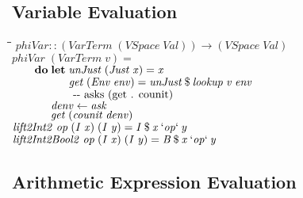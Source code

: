 \documentclass[10pt]{article}
\newlength{\lwidth}\setlength{\lwidth}{4.5cm}
\newlength{\cwidth}\setlength{\cwidth}{8mm} %
\newcommand{\Conid}[1]{\mathit{#1}}
\newcommand{\Varid}[1]{\mathit{#1}}
\begin{document}
\subsection{Variable Evaluation}

\begin{tabbing}
\qquad\=\hspace{\lwidth}\=\hspace{\cwidth}\=\+\kill
${\Varid{phiVar}\mathbin{::}(\Conid{VarTerm}\;(\Conid{VSpace}\;\Conid{Val}))\to (\Conid{VSpace}\;\Conid{Val})}$\\
${\Varid{phiVar}\;(\Conid{VarTerm}\;\Varid{v})\mathrel{=}}$\\
${\hskip2.00em\relax\mathbf{do}\;\mathbf{let}\;\Varid{unJust}\;(\Conid{Just}\;\Varid{x})\mathrel{=}\Varid{x}}$\\
${\hskip2.00em\relax\phantom{\mathbf{do}\;\mathbf{let}\;\mbox{}}\Varid{get}\;(\Conid{Env}\;\Varid{env})\mathrel{=}\Varid{unJust}\mathbin{\$}\Varid{lookup}\;\Varid{v}\;\Varid{env}}$\\
${\hskip2.00em\relax\phantom{\mathbf{do}\;\mbox{}}\mbox{\qquad-{}-  asks (get . counit)}}$\\
${\hskip2.00em\relax\phantom{\mathbf{do}\;\mbox{}}\Varid{denv}\leftarrow \Varid{ask}}$\\
${\hskip2.00em\relax\phantom{\mathbf{do}\;\mbox{}}\Varid{get}\;(\Varid{counit}\;\Varid{denv})}$\\
${}$\\
${}$\\
${\Varid{lift2Int2}\;\Varid{op}\;(\Conid{I}\;\Varid{x})\;(\Conid{I}\;\Varid{y})\mathrel{=}\Conid{I}\mathbin{\$}\Varid{x}\mathbin{`\Varid{op}`}\Varid{y}}$\\
${}$\\
${\Varid{lift2Int2Bool2}\;\Varid{op}\;(\Conid{I}\;\Varid{x})\;(\Conid{I}\;\Varid{y})\mathrel{=}\Conid{B}\mathbin{\$}\Varid{x}\mathbin{`\Varid{op}`}\Varid{y}}$
\end{tabbing}
\subsection{Arithmetic Expression Evaluation}
\end{document}

